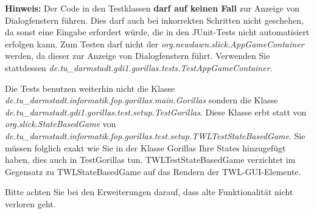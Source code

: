 \textbf{Hinweis:} Der Code in den Testklassen \textbf{darf auf keinen Fall} zur Anzeige von
Dialogfenstern f\"uhren. Dies darf auch bei inkorrekten Schritten nicht geschehen, da sonst eine Eingabe erfordert w\"urde, die in den JUnit-Tests nicht automatisiert erfolgen kann. Zum Testen darf nicht der \textit{org.newdawn.slick.AppGameContainer} werden, da dieser zur Anzeige von Dialogfenstern führt. Verwenden Sie stattdessen \textit{de.tu\_darmstadt.gdi1.gorillas.tests.TestAppGameContainer}.

Die Tests benutzen weiterhin nicht die Klasse \textit{de.tu\_darmstadt.informatik.fop.gorillas.main.Gorillas} sondern die Klasse \textit{
de.tu\_darmstadt.gdi1.gorillas.test.setup.TestGorillas}. Diese Klasse erbt statt von \textit{org.slick.StateBasedGame} von \textit{de.tu\_darmstadt.informatik.fop.gorillas.test.setup.TWLTest\allowbreak StateBasedGame}. Sie müssen folglich exakt wie Sie in der Klasse Gorillas Ihre States hinzugefügt haben, dies auch in TestGorillas tun. TWLTestStateBasedGame verzichtet im Gegensatz zu TWLStateBasedGame auf das Rendern der TWL-GUI-Elemente.

Bitte achten Sie bei den Erweiterungen darauf, dass alte Funktionalität nicht verloren geht.
